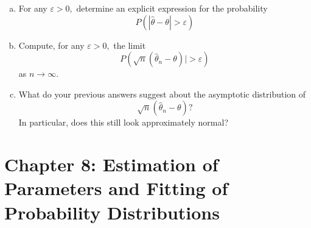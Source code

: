 \documentclass{article}
\begin{document}
\begin{enumerate}
\begin{enumerate}[a)]
			\item For any $\varepsilon>0,$ determine an explicit expression for the probability \[P\left( |\hat{\theta}-\theta| > \varepsilon \right)\]

			\item Compute, for any $\varepsilon>0,$ the limit \[P\left( \sqrt{n}(\hat{\theta}_n-\theta)| > \varepsilon \right) \] as $n\to\infty.$

			\item What do your previous answers suggest about the asymptotic distribution of \[\sqrt{n}(\hat{\theta}_n-\theta)?\] In particular, does this still look approximately normal?
				
		\end{enumerate}
		
\end{enumerate}

\section*{Chapter 8: Estimation of Parameters and Fitting of Probability Distributions}
\end{document}
